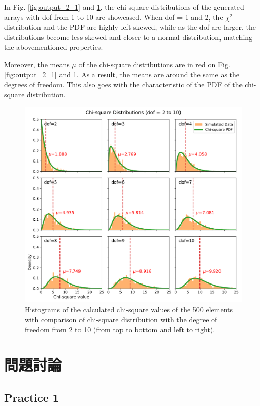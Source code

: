 \documentclass[12pt,a4paper]{article}
\begin{document}
\begin{CJK}{UTF8}{bkai}
In Fig. \ref{fig:output_2_1} and \ref{fig:output_2_2}, the chi-square distributions of the generated arrays with dof from 1 to 10 are showcased. When dof = 1 and 2, the $\chi^2$ distribution and the PDF are highly left-skewed, while as the dof are larger, the distributions become less skewed and closer to a normal distribution, matching the abovementioned properties. 

\clearpage
Moreover, the means $\mu$ of the chi-square distributions are in red on Fig. \ref{fig:output_2_1} and \ref{fig:output_2_2}. As a result, the means are around the same as the degrees of freedom. This also goes with the characteristic of the PDF of the chi-square distribution.

\begin{figure}[h]
    \centering
    \includegraphics[width=1\linewidth]{figures/output/output_2_2.pdf}
    \caption{Histograms of the calculated chi-square values of the 500 elements with comparison of chi-square distribution with the degree of freedom from 2 to 10 (from top to bottom and left to right).}
    \label{fig:output_2_2}
\end{figure}




\clearpage
\section{問題討論}

\subsection{Practice 1}


\end{CJK}
\end{document}
